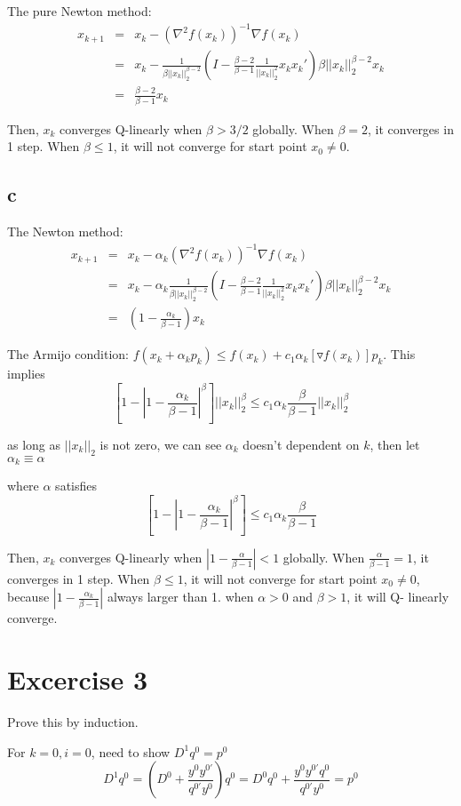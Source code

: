 \documentclass[12pt,a4paper]{article}
\begin{document}
The pure Newton method: \begin{eqnarray*}
x_{k+1}&=&x_k-(\nabla^2 f(x_k))^{-1}\nabla f(x_k)\\
&=& x_k-\frac{1}{\beta||x_k||_2^{\beta-2}}(I-\frac{\beta-2}{\beta-1}\frac{1}{||x_k||_2^2}x_kx_k')\beta ||x_k||_2^{\beta-2} x_k\\
&=&\frac{\beta-2}{\beta-1}x_k
\end{eqnarray*}

Then, $x_k$ converges Q-linearly when $\beta>3/2$ globally. When $\beta=2$, it converges in 1 step. When $\beta \le 1$, it will not converge for start point $x_0\neq0$.

\subsection*{c}
The Newton method: \begin{eqnarray*}
	x_{k+1}&=&x_k-\alpha_k(\nabla^2 f(x_k))^{-1}\nabla f(x_k)\\
	&=& x_k-\alpha_k\frac{1}{\beta||x_k||_2^{\beta-2}}(I-\frac{\beta-2}{\beta-1}\frac{1}{||x_k||_2^2}x_kx_k')\beta ||x_k||_2^{\beta-2} x_k\\
	&=&(1-\frac{\alpha_k}{\beta-1})x_k
	\end{eqnarray*}
	
	The Armijo condition: $f(x_k+\alpha_kp_k)\le f(x_k )+c_1\alpha_k[\triangledown f(x_k)]p_k $. This implies
	\[
	\left[1-|1-\frac{\alpha_k}{\beta-1}|^\beta \right]||x_k||_2^\beta \le c_1\alpha_k \frac{\beta}{\beta-1} ||x_k||_2^\beta
	\]
	
	as long as $||x_k||_2$ is not zero, we can see $\alpha_k$ doesn't dependent on $k$, then let $\alpha_k\equiv\alpha$ 
	
	where $\alpha$ satisfies\[
	\left[1-|1-\frac{\alpha_k}{\beta-1}|^\beta \right]\le c_1\alpha_k \frac{\beta}{\beta-1} 	
	\]
	
	Then, $x_k$ converges Q-linearly when $|1-\frac{\alpha}{\beta-1}|<1$ globally. When $\frac{\alpha}{\beta-1}=1$, it converges in 1 step. When $\beta \le 1$, it will not converge for start point $x_0\neq0$, because $|1-\frac{\alpha_k}{\beta-1}|$ always larger than 1. when $\alpha>0$ and $\beta>1$, it will Q- linearly converge.


\section*{Excercise 3}
Prove this by induction.

For $k=0,i=0$, need to show $D^1q^0=p^0$
\[
D^1q^0=(D^0+\frac{y^0y^{0'}}{q^{0'}y^0})q^0=D^0q^0+\frac{y^0y^{0'}q^0}{q^{0'}y^0}=p^0
\]
\end{document}
